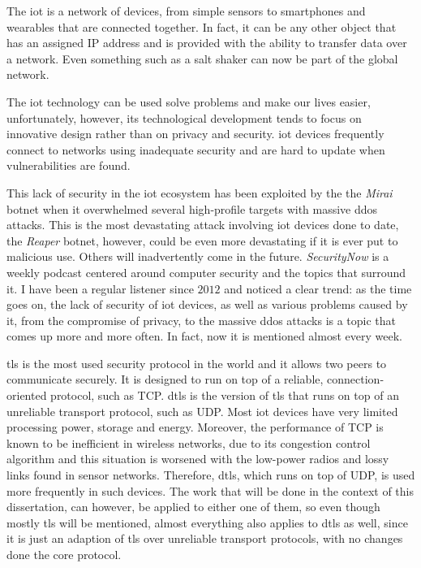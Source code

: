 \documentclass{llncs}
\begin{document}
The \gls{iot} is a network of devices, from simple sensors to smartphones and wearables
that are connected together. In fact, it can be any other object that has an assigned
IP address and is provided with the ability to transfer data over a network. Even
something such as a salt shaker\cite{SMALTThe76:online} can now be part of the global network.

The \gls{iot} technology can be used solve problems and make our lives easier,
unfortunately, however, its technological development tends to focus on
innovative design rather than on privacy and security. \gls{iot} devices frequently
connect to networks using inadequate security and are hard to update when
vulnerabilities are found.

This lack of security in the \gls{iot} ecosystem has been exploited by the
the \textit{Mirai} botnet\cite{sec17ant94:online} when it overwhelmed several high-profile
targets with massive \gls{ddos} attacks. This is the most devastating attack involving \gls{iot}
devices done to date, the \textit{Reaper} botnet\cite{ReaperCa10:online}, however, could be
even more devastating if it is ever put to malicious use. Others will inadvertently
come in the future. \textit{SecurityNow}\cite{GRCSecur72:online} is a weekly podcast
centered around computer security and the topics that surround it. I have been a regular listener
since $2012$ and noticed a clear trend: as the time goes on, the lack of
security of \gls{iot} devices, as well as various problems caused by it, from
the compromise of privacy, to the massive \gls{ddos} attacks is a topic that comes up
more and more often. In fact, now it is mentioned almost every week.

\gls{tls} is the most used security protocol in the world and it allows two peers
to communicate securely. It is designed to run on top of a reliable, connection-oriented
protocol, such as TCP. \gls{dtls} is the version of \gls{tls} that runs on top
of an unreliable transport protocol, such as UDP. Most \gls{iot} devices have
very limited processing power, storage and energy. Moreover, the performance of
TCP is known to be inefficient in wireless networks, due to its congestion control
algorithm and this situation is worsened with the low-power radios and lossy
links found in sensor networks. Therefore, \gls{dtls}, which runs on top
of UDP, is used more frequently in such devices. The work that will be done in the context of this dissertation, can however,
be applied to either one of them, so even though mostly
\gls{tls} will be mentioned, almost everything also applies to \gls{dtls} as well, since it is just
an adaption of \gls{tls} over unreliable transport protocols, with no changes done
the core protocol.
\end{document}
